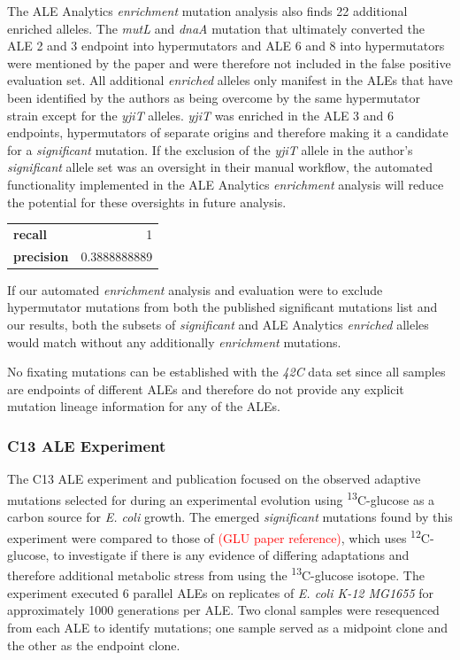 \documentclass[12pt,final,masters,chapterheads]{ucsd}  %
\newcommand\todo[1]{\textcolor{red}{#1}}
\begin{document}
The ALE Analytics \textit{enrichment} mutation analysis also finds 22 additional enriched alleles. The \textit{mutL} and \textit{dnaA} mutation that ultimately converted the ALE 2 and 3 endpoint into hypermutators and ALE 6 and 8 into hypermutators were mentioned by the paper and were therefore not included in the false positive evaluation set. All additional \textit{enriched} alleles only manifest in the ALEs that have been identified by the authors as being overcome by the same hypermutator strain except for the \textit{yjiT} alleles. \textit{yjiT} was enriched in the ALE 3 and 6 endpoints, hypermutators of separate origins and therefore making it a candidate for a \textit{significant} mutation. If the exclusion of the \textit{yjiT} allele in the author's \textit{significant} allele set was an oversight in their manual workflow, the automated functionality implemented in the ALE Analytics \textit{enrichment} analysis will reduce the potential for these oversights in future analysis.

\begin{table}[h!]
\centering
\begin{tabular}{ l r }
  \textbf{recall} & 1 \\
  \textbf{precision} & 0.3888888889 \\
\end{tabular}
\end{table}

If our automated \textit{enrichment} analysis and evaluation were to exclude hypermutator mutations from both the published significant mutations list and our results, both the subsets of \textit{significant} and ALE Analytics \textit{enriched} alleles would match without any additionally \textit{enrichment} mutations.

No fixating mutations can be established with the \textit{42C} data set since all samples are endpoints of different ALEs and therefore do not provide any explicit mutation lineage information for any of the ALEs.

\subsubsection{C13 ALE Experiment}

The C13 ALE experiment and publication focused on the observed adaptive mutations selected for during an experimental evolution using \textsuperscript{13}C-glucose as a carbon source for \textit{E. coli} growth. The emerged \textit{significant} mutations found by this experiment were compared to those of \todo{(GLU paper reference)}, which uses \textsuperscript{12}C-glucose, to investigate if there is any evidence of differing adaptations and therefore additional metabolic stress from using the \textsuperscript{13}C-glucose isotope. The experiment executed 6 parallel ALEs  on replicates of \textit{E. coli K-12 MG1655} for approximately 1000 generations per ALE. Two clonal samples were resequenced from each ALE to identify mutations; one sample served as a midpoint clone and the other as the endpoint clone. 
\end{document}
